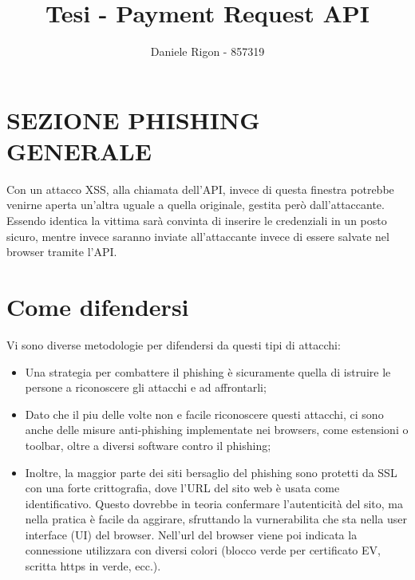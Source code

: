 \documentclass[11pt ,a4paper , twoside , openright ]{article}
\author{
	Daniele Rigon - 857319 \\
}
\begin{document}
	
	\title{Tesi - Payment Request API}
	\maketitle
	
	\tableofcontents
	
	\pagebreak
	\newpage
	\section{SEZIONE PHISHING GENERALE}
	Con un attacco XSS, alla chiamata dell'API, invece di questa finestra potrebbe venirne aperta un'altra uguale a quella originale, gestita però dall'attaccante. Essendo identica la vittima sarà convinta di inserire le credenziali in un posto sicuro, mentre invece saranno inviate all'attaccante invece di essere salvate nel browser tramite l'API.
	
	\section{Come difendersi}
	Vi sono diverse metodologie per difendersi da questi tipi di attacchi:
	\begin{itemize}
		\item Una strategia per combattere il phishing è sicuramente quella di istruire le persone a riconoscere gli attacchi e ad affrontarli;
		\item Dato che il piu delle volte non e facile riconoscere questi attacchi, ci sono anche delle misure anti-phishing implementate nei browsers, come estensioni o toolbar, oltre a diversi software contro il phishing;
		\item Inoltre, la maggior parte dei siti bersaglio del phishing sono protetti da SSL con una forte crittografia, dove l'URL del sito web è usata come identificativo. Questo dovrebbe in teoria confermare l'autenticità del sito, ma nella pratica è facile da aggirare, sfruttando la vurnerabilita che sta nella user interface (UI) del browser. Nell'url del browser viene poi indicata la connessione utilizzara con diversi colori (blocco verde per certificato EV, scritta https in verde, ecc.).
	\end{itemize}
\end{document}
